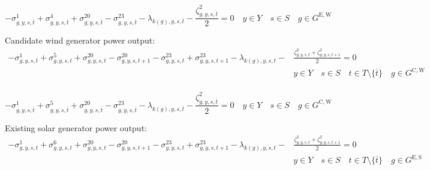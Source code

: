 \documentclass{article}
\newcommand{\sGeneratorsExistingWind}{G^{\mathrm{E,W}}}
\newcommand{\sGeneratorsExistingSolar}{G^{\mathrm{E,S}}}
\newcommand{\sGeneratorsCandidateWind}{G^{\mathrm{C,W}}}
\newcommand{\sYears}{Y}
\newcommand{\sScenarios}{S}
\newcommand{\sIntervals}{T}
\newcommand{\iGenerator}{g}
\newcommand{\iYear}{y}
\newcommand{\iScenario}{s}
\newcommand{\iInterval}{t}
\newcommand{\iIntervalTerminal}{\overline{\iInterval}}
\newcommand{\iZone}{z}
\newcommand{\dMinPowerOutput}[1][\iGenerator,\iYear,\iScenario,\iInterval]{\sigma_{#1}^{1}}
\newcommand{\dMaxPowerOutputWindExisting}[1][\iGenerator,\iYear,\iScenario,\iInterval]{\sigma_{#1}^{4}}
\newcommand{\dMaxPowerOutputWindCandidate}[1][\iGenerator,\iYear,\iScenario,\iInterval]{\sigma_{#1}^{5}}
\newcommand{\dMaxPowerOutputSolarExisting}[1][\iGenerator,\iYear,\iScenario,\iInterval]{\sigma_{#1}^{6}}
\newcommand{\dRampRateUp}[1][\iGenerator,\iYear,\iScenario,\iInterval]{\sigma_{#1}^{20}}
\newcommand{\dRampRateDown}[1][\iGenerator,\iYear,\iScenario,\iInterval]{\sigma_{#1}^{23}}
\newcommand{\dPowerBalance}[1][\iZone,\iYear,\iScenario,\iInterval]{\lambda_{#1}}
\newcommand{\dGeneratorEnergyOutput}[1][\iGenerator,\iYear,\iScenario,\iInterval]{\zeta_{#1}^{2}}
\begin{document}
\begin{equation}
 -\dMinPowerOutput[\iGenerator,\iYear,\iScenario,\iIntervalTerminal] + \dMaxPowerOutputWindExisting[\iGenerator,\iYear,\iScenario,\iIntervalTerminal] + \dRampRateUp[\iGenerator,\iYear,\iScenario,\iIntervalTerminal] - \dRampRateDown[\iGenerator,\iYear,\iScenario,\iIntervalTerminal] - \dPowerBalance[k(\iGenerator),\iYear,\iScenario,\iIntervalTerminal] - \frac{\dGeneratorEnergyOutput[\iGenerator,\iYear,\iScenario,\iIntervalTerminal]}{2} = 0 \quad \iYear \in \sYears \quad \iScenario \in \sScenarios \quad \iGenerator \in \sGeneratorsExistingWind
\end{equation}

Candidate wind generator power output:
\begin{align}
-\dMinPowerOutput + \dMaxPowerOutputWindCandidate + \dRampRateUp - \dRampRateUp[\iGenerator,\iYear,\iScenario,\iInterval+1] - \dRampRateDown + \dRampRateDown[\iGenerator,\iYear,\iScenario,\iInterval+1] - \dPowerBalance[k(\iGenerator),\iYear,\iScenario,\iInterval] - & \frac{\dGeneratorEnergyOutput + \dGeneratorEnergyOutput[\iGenerator,\iYear,\iScenario,\iInterval+1]}{2} = 0 \\\nonumber
& \iYear \in \sYears \quad \iScenario \in \sScenarios \quad \iInterval \in \sIntervals \setminus \{\iIntervalTerminal\} \quad \iGenerator \in \sGeneratorsCandidateWind\\\nonumber
\end{align}

\begin{equation}
-\dMinPowerOutput[\iGenerator,\iYear,\iScenario,\iIntervalTerminal] + \dMaxPowerOutputWindCandidate[\iGenerator,\iYear,\iScenario,\iIntervalTerminal] + \dRampRateUp[\iGenerator,\iYear,\iScenario,\iIntervalTerminal] - \dRampRateDown[\iGenerator,\iYear,\iScenario,\iIntervalTerminal] - \dPowerBalance[k(\iGenerator),\iYear,\iScenario,\iIntervalTerminal] - \frac{\dGeneratorEnergyOutput[\iGenerator,\iYear,\iScenario,\iIntervalTerminal]}{2} = 0 \quad \iYear \in \sYears \quad \iScenario \in \sScenarios \quad \iGenerator \in \sGeneratorsCandidateWind
\end{equation}

Existing solar generator power output:
\begin{align}
-\dMinPowerOutput + \dMaxPowerOutputSolarExisting + \dRampRateUp - \dRampRateUp[\iGenerator,\iYear,\iScenario,\iInterval+1] - \dRampRateDown + \dRampRateDown[\iGenerator,\iYear,\iScenario,\iInterval+1] - \dPowerBalance[k(\iGenerator),\iYear,\iScenario,\iInterval] - & \frac{\dGeneratorEnergyOutput + \dGeneratorEnergyOutput[\iGenerator,\iYear,\iScenario,\iInterval+1]}{2} = 0 \\\nonumber
& \iYear \in \sYears \quad \iScenario \in \sScenarios \quad \iInterval \in \sIntervals \setminus \{\iIntervalTerminal\} \quad \iGenerator \in \sGeneratorsExistingSolar\\\nonumber
\end{align}
\end{document}
